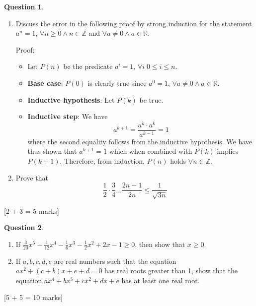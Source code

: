 \documentclass[a4paper]{article}
\theoremstyle{definition}
\newtheorem{question}{Question}
\newcommand{\qmarks}[1]{{\hspace*{\fill} [#1 marks]}}
\begin{document}
\begin{question}\
    \begin{enumerate}
	\item Discuss the error in the following proof by strong induction for the statement $a^n = 1$, $\forall n \ge 0 \land n \in \mathbb{Z}$ and $\forall a \neq 0 \land a \in \mathbb{R}$.

	    Proof:
	    \begin{itemize}
		\item Let $P(n)$ be the predicate $a^i = 1$, $\forall i \; 0 \le i \le n$.
		\item \textbf{Base case}: $P(0)$ is clearly true since $a^0 = 1$, $\forall a \neq 0 \land a \in \mathbb{R}$.
		\item \textbf{Inductive hypothesis}: Let $P(k)$ be true.
		\item \textbf{Inductive step}: We have
		    \begin{equation*}
			a^{k+1} = \frac{a^k \cdot a^k}{a^{k-1}} = 1
		    \end{equation*}
		    where the second equality follows from the inductive hypothesis.
		    We have thus shown that $a^{k+1} = 1$ which when combined with $P(k)$ implies $P(k+1)$.
		    Therefore, from induction, $P(n)$ holds $\forall n \in \mathbb{Z}$.
	    \end{itemize}

        \item Prove that
            \begin{equation*}
                \frac{1}{2} \cdot \frac{3}{4} \ldots \frac{2n - 1}{2n} \le \frac{1}{\sqrt{3n}}
            \end{equation*}
    \end{enumerate}

    \qmarks{2 + 3 = 5}
\end{question}

\begin{question}\
    \begin{enumerate}
        \item If $\frac{3}{20}x^5 - \frac{1}{12}x^4 - \frac{1}{6}x^3 - \frac{1}{2}x^2
            + 2x - 1 \geq 0$, then show that $x \geq 0$.
        \item If $a, b, c, d, e$ are real numbers such that the equation $ax^2 + (c + b)x + e + d = 0$ has real roots greater than 1, show that the equation $ax^4 + bx^3 + cx^2 + dx + e$ has at least one real root.
    \end{enumerate}
    \qmarks{5 + 5 = 10}
\end{question}
\end{document}
